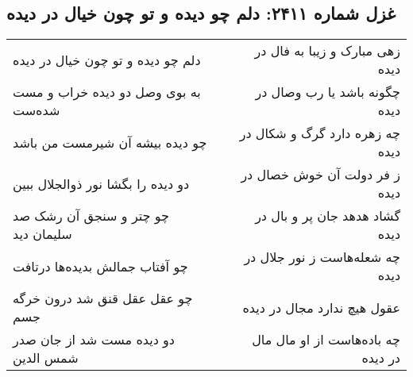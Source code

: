 \begin{center}
\section*{غزل شماره ۲۴۱۱: دلم چو دیده و تو چون خیال در دیده}
\label{sec:2411}
\begin{longtable}{l p{0.5cm} r}
دلم چو دیده و تو چون خیال در دیده
&&
زهی مبارک و زیبا به فال در دیده
\\
به بوی وصل دو دیده خراب و مست شده‌ست
&&
چگونه باشد یا رب وصال در دیده
\\
چو دیده بیشه آن شیرمست من باشد
&&
چه زهره دارد گرگ و شکال در دیده
\\
دو دیده را بگشا نور ذوالجلال ببین
&&
ز فر دولت آن خوش خصال در دیده
\\
چو چتر و سنجق آن رشک صد سلیمان دید
&&
گشاد هدهد جان پر و بال در دیده
\\
چو آفتاب جمالش بدیده‌ها درتافت
&&
چه شعله‌هاست ز نور جلال در دیده
\\
چو عقل عقل قنق شد درون خرگه جسم
&&
عقول هیچ ندارد مجال در دیده
\\
دو دیده مست شد از جان صدر شمس الدین
&&
چه باده‌هاست از او مال مال در دیده
\\
\end{longtable}
\end{center}

